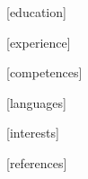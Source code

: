 \documentclass[11pt,a4paper,roman]{article}        %
\begin{document}


        [education]
        

        [experience]
        

        [competences]
        

        [languages]
        

        [interests]
        

        [references]
        
\end{document}
